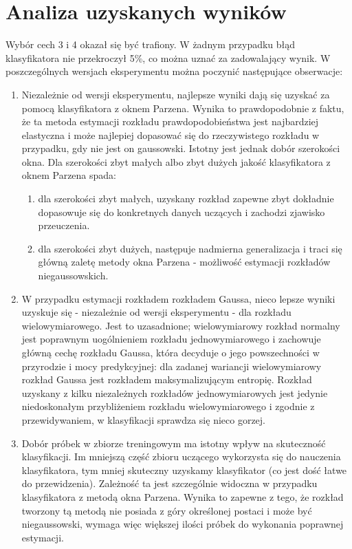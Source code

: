\documentclass{article}
\begin{document}
	\section{Analiza uzyskanych wyników}
	
	Wybór cech 3 i 4 okazał się być trafiony. W żadnym przypadku błąd klasyfikatora nie przekroczył 5\%, co można uznać za zadowalający wynik. W poszczególnych wersjach eksperymentu można poczynić następujące obserwacje:
	\begin{enumerate}
		\item Niezależnie od wersji eksperymentu, najlepsze wyniki dają się uzyskać za pomocą klasyfikatora z oknem Parzena. Wynika to prawdopodobnie z faktu, że ta metoda estymacji rozkładu prawdopodobieństwa jest najbardziej elastyczna i może najlepiej dopasować się do rzeczywistego rozkładu w przypadku, gdy nie jest on gaussowski. Istotny jest jednak dobór szerokości okna. Dla szerokości zbyt małych albo zbyt dużych jakość klasyfikatora z oknem Parzena spada:
		\begin{enumerate}
			\item dla szerokości zbyt małych, uzyskany rozkład zapewne zbyt dokładnie dopasowuje się do konkretnych danych uczących i zachodzi zjawisko przeuczenia. 
			\item dla szerokości zbyt dużych, następuje nadmierna generalizacja i traci się główną zaletę metody okna Parzena - możliwość estymacji rozkładów niegaussowskich. 
		\end{enumerate}
		\item W przypadku estymacji rozkładem rozkładem Gaussa, nieco lepsze wyniki uzyskuje się - niezależnie od wersji eksperymentu - dla rozkładu wielowymiarowego. Jest to uzasadnione; wielowymiarowy rozkład normalny jest poprawnym uogólnieniem rozkładu jednowymiarowego i zachowuje główną cechę rozkładu Gaussa, która decyduje o jego powszechności w przyrodzie i mocy predykcyjnej: dla zadanej wariancji wielowymiarowy rozkład Gaussa jest rozkładem maksymalizującym entropię. Rozkład uzyskany z kilku niezależnych rozkładów jednowymiarowych jest jedynie niedoskonałym przybliżeniem rozkładu wielowymiarowego i zgodnie z przewidywaniem, w klasyfikacji sprawdza się nieco gorzej. 
		\item Dobór próbek w zbiorze treningowym ma istotny wpływ na skuteczność klasyfikacji. Im mniejszą część zbioru uczącego wykorzysta się do nauczenia klasyfikatora, tym mniej skuteczny uzyskamy klasyfikator (co jest dość łatwe do przewidzenia). Zależność ta jest szczególnie widoczna w przypadku klasyfikatora z metodą okna Parzena. Wynika to zapewne z tego, że rozkład tworzony tą metodą nie posiada z góry określonej postaci i może być niegaussowski, wymaga więc większej ilości próbek do wykonania poprawnej estymacji. 

\end{enumerate}
\end{document}
